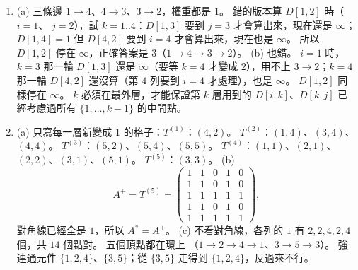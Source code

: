 \begin{enumerate}
\begin{gather*}
\Pi^{(3)} = \begin{pmatrix} - & \mathbf{3} & 1 & 2 \\ 2 & - & 1 & 2 \\ 2 & 3 & - & 2 \\ \mathbf{2} & \mathbf{3} & 4 & - \end{pmatrix}.
\end{gather*}
$D^{(4)} = D^{(3)}$、$\Pi^{(4)} = \Pi^{(3)}$，第 $4$ 層沒有格子變小。 幾個要注意的地方：$d_{14}$ 在
第 $2$ 層變成 $9$（$1 \to 2 \to 4$），第 $3$ 層又變成 $7$（$1 \to 3 \to 2 \to 4$），$\pi_{14}$ 都是
$2$，因為兩條路徑的最後一條邊都是 $2 \to 4$；$\pi_{12}$ 在第 $3$ 層從 $1$ 變成 $3$。
(b) $4$ 到 $2$：$\pi_{42} = 3$、$\pi_{43} = 4$，路徑 $4 \to 3 \to 2$，權重 $-2 + 1 = -1 = d_{42}$。
$1$ 到 $4$：$\pi_{14} = 2$、$\pi_{12} = 3$、$\pi_{13} = 1$，路徑 $1 \to 3 \to 2 \to 4$，權重 $2 + 1 + 4 =
7 = d_{14}$。
(c) $n - 1 = 3$，算到 $L^{(4)}$，兩次乘法。 $n = 100$ 時 $n - 1 = 99$，$2^7 = 128 \ge 99$，七次。

\item (a) 三條邊 $1 \to 4$、$4 \to 3$、$3 \to 2$，權重都是 $1$。 錯的版本算 $D[1, 2]$ 時（$i = 1$、
$j = 2$），試 $k = 1..4$：$D[1, 3]$ 要到 $j = 3$ 才會算出來，現在還是 $\infty$；$D[1, 4] = 1$ 但
$D[4, 2]$ 要到 $i = 4$ 才會算出來，現在也是 $\infty$。 所以 $D[1, 2]$ 停在 $\infty$，正確答案是
$3$（$1 \to 4 \to 3 \to 2$）。
(b) 也錯。 $i = 1$ 時，$k = 3$ 那一輪 $D[1, 3]$ 還是 $\infty$（要等 $k = 4$ 才變成 $2$），用不上
$3 \to 2$；$k = 4$ 那一輪 $D[4, 2]$ 還沒算（第 $4$ 列要到 $i = 4$ 才處理），也是 $\infty$。 $D[1, 2]$
同樣停在 $\infty$。 $k$ 必須在最外層，才能保證第 $k$ 層用到的 $D[i, k]$、$D[k, j]$ 已經考慮過所有
$\{1, \ldots, k - 1\}$ 的中間點。

\item (a) 只寫每一層新變成 $1$ 的格子：$T^{(1)}$：$(4, 2)$。 $T^{(2)}$：$(1, 4)$、$(3, 4)$、$(4, 4)$。
$T^{(3)}$：$(5, 2)$、$(5, 4)$、$(5, 5)$。 $T^{(4)}$：$(1, 1)$、$(2, 1)$、$(2, 2)$、$(3, 1)$、$(5, 1)$。
$T^{(5)}$：$(3, 3)$。
(b)
\[
A^{+} = T^{(5)} = \begin{pmatrix} 1&1&0&1&0 \\ 1&1&0&1&0 \\ 1&1&1&1&1 \\ 1&1&0&1&0 \\ 1&1&1&1&1 \end{pmatrix},
\]
對角線已經全是 $1$，所以 $A^{*} = A^{+}$。
(c) 不看對角線，各列的 $1$ 有 $2, 2, 4, 2, 4$ 個，共 $14$ 個點對。 五個頂點都在環上
（$1 \to 2 \to 4 \to 1$、$3 \to 5 \to 3$）。 強連通元件 $\{1, 2, 4\}$、$\{3, 5\}$；從 $\{3, 5\}$ 走得到
$\{1, 2, 4\}$，反過來不行。


\end{enumerate}
